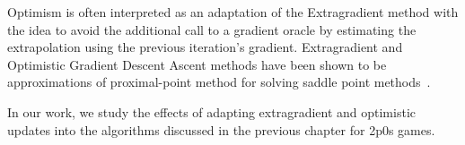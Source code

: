 
Optimism is often interpreted as an adaptation of the Extragradient method with the idea to avoid
the additional call to a gradient oracle by estimating the extrapolation using the previous
iteration's gradient.
Extragradient and Optimistic Gradient Descent Ascent methods have been shown to be approximations
of proximal-point method for solving saddle point methods~\cite{mokhtariUnified2020}.

In our work, we study the effects of adapting extragradient and optimistic updates into the
algorithms discussed in the previous chapter for 2p0s games.

